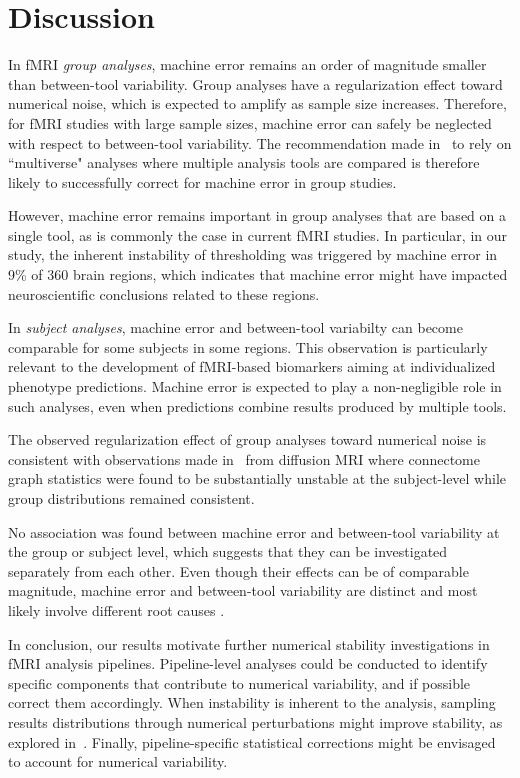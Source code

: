 \documentclass[conference]{IEEEtran}
\begin{document}
\section{Discussion}

In fMRI \emph{group analyses}, machine error remains an order of magnitude
smaller than between-tool variability. Group analyses have a regularization
effect toward numerical noise, which is expected to amplify as sample size
increases. Therefore, for fMRI studies with large sample sizes, machine
error can safely be neglected with respect to between-tool variability. The
recommendation made in~\cite{botvinik2020variability} to rely on ``multiverse" analyses where
multiple analysis tools are compared is therefore likely to successfully correct
for machine error in group studies.

However, machine error remains important in group analyses that are based
on a single tool, as is commonly the case in current fMRI studies. In
particular, in our study, the inherent instability of thresholding was
triggered by machine error in 9\% of 360 brain regions, which indicates
that machine error might have impacted neuroscientific conclusions related
to these regions. 

In \emph{subject analyses}, machine error and between-tool variabilty can
become comparable for some subjects in some regions. This observation is particularly
relevant to the development of fMRI-based biomarkers aiming at
individualized phenotype predictions. Machine error is expected to play
a non-negligible role in such analyses, even when predictions combine
results produced by multiple tools.

The observed regularization effect of group analyses toward numerical noise 
is consistent with observations made in~\cite{kiar2020numerical} from diffusion MRI where 
connectome graph statistics were found to be substantially unstable at the subject-level 
while group distributions remained consistent. 


No association was found between
machine error and between-tool variability at the group or subject level,
which suggests that they can be investigated separately from each other.
Even though their effects can be of comparable magnitude, machine error and
between-tool variability are distinct and most likely involve different
root causes .

In conclusion, our results motivate further numerical stability
investigations in fMRI analysis pipelines. Pipeline-level analyses could be
conducted to identify specific components that contribute to numerical
variability, and if possible correct them accordingly. When instability is
inherent to the analysis, sampling results distributions through numerical
perturbations might improve stability, as explored in~\cite{kiar2021data}.
Finally, pipeline-specific statistical corrections might be envisaged to
account for numerical variability.







\end{document}

